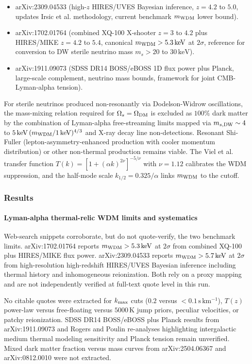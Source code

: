 \documentclass[11pt,a4paper]{article}
\begin{document}
\begin{itemize}
  \item arXiv:2309.04533 (high-$z$ HIRES/UVES Bayesian inference, $z = 4.2$ to $5.0$, updates Irsic et al. methodology, current benchmark $m_{\rm WDM}$ lower bound).
  \item arXiv:1702.01764 (combined XQ-100 X-shooter $z = 3$ to $4.2$ plus HIRES/MIKE $z = 4.2$ to $5.4$, canonical $m_{\rm WDM} > 5.3\,\mathrm{keV}$ at $2\sigma$, reference for conversion to DW sterile neutrino mass $m_s > 20$ to $30\,\mathrm{keV}$).
  \item arXiv:1911.09073 (SDSS DR14 BOSS/eBOSS 1D flux power plus Planck, large-scale complement, neutrino mass bounds, framework for joint CMB-Lyman-alpha tension).
\end{itemize}
For sterile neutrinos produced non-resonantly via Dodelson-Widrow oscillations, the mass-mixing relation required for $\Omega_s = \Omega_{\rm DM}$ is excluded as $100\%$ dark matter by the combination of Lyman-alpha free-streaming limits mapped via $m_{s,{\rm DW}} \sim 4$ to $5\,\mathrm{keV}\,(m_{\rm WDM}/1\,\mathrm{keV})^{4/3}$ and X-ray decay line non-detections. Resonant Shi-Fuller (lepton-asymmetry-enhanced production with cooler momentum distribution) or other non-thermal production remains viable. The Viel et al. transfer function $T(k) = [1+(\alpha k)^{2\nu}]^{-5/\nu}$ with $\nu = 1.12$ calibrates the WDM suppression, and the half-mode scale $k_{1/2} = 0.325/\alpha$ links $m_{\rm WDM}$ to the cutoff.

\subsubsection*{Results}
\paragraph{Lyman-alpha thermal-relic WDM limits and systematics}
Web-search snippets corroborate, but do not quote-verify, the two benchmark limits. arXiv:1702.01764 reports $m_{\rm WDM} > 5.3\,\mathrm{keV}$ at $2\sigma$ from combined XQ-100 plus HIRES/MIKE flux power. arXiv:2309.04533 reports $m_{\rm WDM} > 5.7\,\mathrm{keV}$ at $2\sigma$ from high-resolution high-redshift HIRES/UVES Bayesian inference including thermal history and inhomogeneous reionization. Both rely on a proxy mapping and are not independently verified at full-text quote level in this run.

No citable quotes were extracted for $k_{\rm max}$ cuts ($0.2$ versus $<0.1\,\mathrm{s\,km^{-1}}$), $T(z)$ power-law versus free-floating versus $5000\,\mathrm{K}$ jump priors, peculiar velocities, or patchy reionization. SDSS DR14 BOSS/eBOSS plus Planck results from arXiv:1911.09073 and Rogers and Poulin re-analyses highlighting intergalactic medium thermal modeling sensitivity and Planck tension remain unverified. Mixed dark matter fraction versus mass curves from arXiv:2504.06367 and arXiv:0812.0010 were not extracted.
\end{document}
